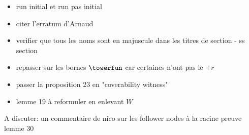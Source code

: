 \begin{itemize}
    \item run initial et run pas initial 
    \item citer l'erratum d'Arnaud
    \item verifier que tous les noms sont en majuscule dans les titres de section - ss section
    \item repasser sur les bornes $\towerfun$ car certaines n'ont pas le $+r$
    \item passer la proposition 23 en "coverability witness"
    \item lemme 19 à reformuler en enlevant $W$
\end{itemize}


A discuter: un commentaire de nico sur les follower nodes à la racine
preuve lemme 30
